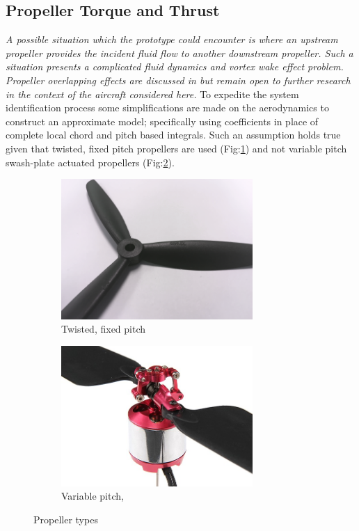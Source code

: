 \subsection{Propeller Torque and Thrust}
\label{subsec:dynamics.aero.bem}
\emph{\color{Gray} A possible situation which the prototype could encounter is where an upstream propeller provides the incident fluid flow to another downstream propeller. Such a situation presents a complicated fluid dynamics and vortex wake effect problem. Propeller overlapping effects are discussed in \cite{configurationpropulsion} but remain open to further research in the context of the aircraft considered here.}
\newpage
To expedite the system identification process some simplifications are made on the aerodynamics to construct an approximate model; specifically using coefficients in place of complete local chord and pitch based integrals. Such an assumption holds true given that twisted, fixed pitch propellers are used (Fig:\ref{fig:fixed-pitch}) and not variable pitch swash-plate actuated propellers (Fig:\ref{fig:variable-pitch}).
\begin{figure}[htbp]
\centering
\begin{subfigure}{0.49\textwidth}
\centering
\includegraphics[width=0.8\textwidth]{figs/fixed-pitch}
\caption{Twisted, fixed pitch}
\label{fig:fixed-pitch}
\end{subfigure}
\begin{subfigure}{0.49\textwidth}
\centering
\includegraphics[width=0.8\textwidth]{figs/variable-pitch}
\caption{Variable pitch, \cite{variablepitch}}
\label{fig:variable-pitch}
\end{subfigure}
\caption{Propeller types}
\label{fig:props}
\vspace{-20pt}
\end{figure}
